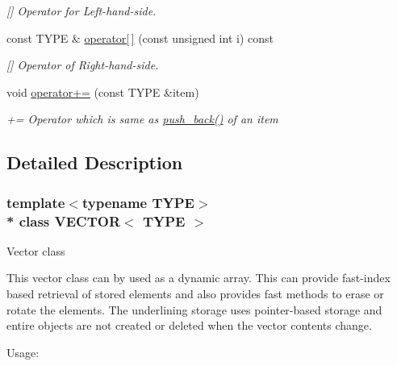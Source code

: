 \begin{DoxyCompactItemize}
\begin{DoxyCompactList}\small\item\em \mbox{[}\mbox{]} Operator for Left-\/hand-\/side. \end{DoxyCompactList}\item 
const T\+Y\+PE \& \hyperlink{classVECTOR_a9f4cad711d746db70ca3e7b36f729497}{operator\mbox{[}$\,$\mbox{]}} (const unsigned int i) const 
\begin{DoxyCompactList}\small\item\em \mbox{[}\mbox{]} Operator of Right-\/hand-\/side. \end{DoxyCompactList}\item 
void \hyperlink{classVECTOR_af668ddce4060cd44994e8d646fb6f3e5}{operator+=} (const T\+Y\+PE \&item)
\begin{DoxyCompactList}\small\item\em += Operator which is same as \hyperlink{classVECTOR_aa86473de53119987158cebdd5a614f1b}{push\+\_\+back()} of an item \end{DoxyCompactList}\end{DoxyCompactItemize}


\subsection{Detailed Description}
\subsubsection*{template$<$typename T\+Y\+PE$>$\\*
class V\+E\+C\+T\+O\+R$<$ T\+Y\+P\+E $>$}

Vector class

This vector class can by used as a dynamic array. This can provide fast-\/index based retrieval of stored elements and also provides fast methods to erase or rotate the elements. The underlining storage uses pointer-\/based storage and entire objects are not created or deleted when the vector contents change.

Usage\+: 
 

